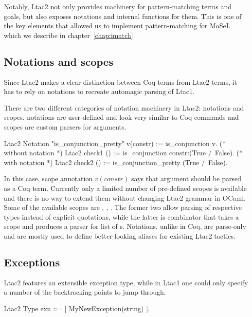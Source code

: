 Notably, Ltac2 not only provides machinery for pattern-matching terms and goals, but also exposes notations and internal functions for them.
This is one of the key elements that allowed us to implement pattern-matching for MoSeL which we describe in chapter~\ref{chap:imatch}.

\subsection{Notations and scopes}
\label{subsec:ltac2-notations-scopes}

Since Ltac2 makes a clear distinction between Coq terms from Ltac2 terms, it has to rely on notations to recreate automagic parsing of Ltac1.

There are two different categories of notation machinery in Ltac2: notations and scopes.
notations are user-defined and look very similar to Coq  commands and scopes are custom parsers for arguments.
\begin{coq}
Ltac2 Notation "is_conjunction_pretty" v(constr) := is_conjunction v.
(* without notation *)
Ltac2 check1 () := is_conjunction constr:(True /\ False).
(* with notation *)
Ltac2 check2 () := is_conjunction_pretty (True /\ False).
\end{coq}

In this case, scope annotation \(v(constr)\) says that argument  should be parsed as a Coq term.
Currently only a limited number of pre-defined scopes is available and there is no way to extend them without changing Ltac2 grammar in OCaml.
Some of the available scopes are , , .
The former two allow parsing of respective types instead of explicit quotations, while the latter is combinator that takes a scope  and produces a parser for list of s.
Notations, unlike in Coq, are parse-only and are mostly used to define better-looking aliases for existing Ltac2 tactics.

\subsection{Exceptions}
\label{subsec:ltac2-exceptions}

Ltac2 features an extensible exception type, while in Ltac1 one could only specify a number of the backtracking points to jump through.
\begin{coq}
Ltac2 Type exn ::= [ MyNewException(string) ].
\end{coq}


